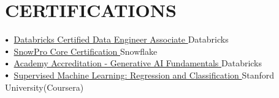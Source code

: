 \documentclass[letterpaper,11pt]{article}
\newcommand\sbullet[1][.5]{\mathbin{\vcenter{\hbox{\scalebox{#1}{$\bullet$}}}}}
\begin{document}
\section{CERTIFICATIONS}
$\sbullet[.75] \hspace{0.2cm}${\href{https://credentials.databricks.com/f1901b96-7a95-476b-a5de-4155079a63c4#acc.Pp3ksNlb}{Databricks Certified Data Engineer Associate  \href{}{\raisebox{-0.1\height}\faExternalLink }}}\hspace{1.45cm} \hfill{Databricks}\\
$\sbullet[.75] \hspace{0.2cm}${\href{https://achieve.snowflake.com/6e13dba2-28c7-4cbc-b8ad-6375956ae4a5#acc.iorTtmpe}{SnowPro Core Certification  \href{certificateLink.com}{\raisebox{-0.1\height}\faExternalLink }}}\hspace{1.45cm} \hfill{Snowflake}\\
$\sbullet[.75] \hspace{0.2cm}${\href{https://credentials.databricks.com/75e53e43-255a-4282-8bd3-2fcf4f64d5fe#acc.npDm2Z3i}{Academy Accreditation - Generative AI Fundamentals   \href{}{\raisebox{-0.1\height}\faExternalLink }}}\hspace{1.45cm} \hfill{Databricks}\\
$\sbullet[.75] \hspace{0.2cm}${\href{https://www.coursera.org/account/accomplishments/verify/R8XU84PS6MXG}{Supervised Machine Learning: Regression and Classification    \href{}{\raisebox{-0.1\height}\faExternalLink }}}\hspace{1.45cm} \hfill{Stanford University(Coursera)}\\
\end{document}
